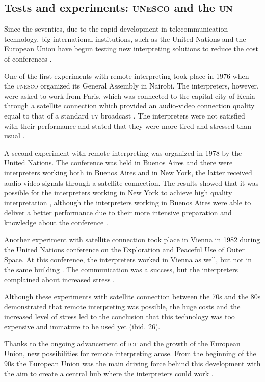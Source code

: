 \documentclass[output=paper]{langsci/langscibook}
\begin{document}
\subsection{Tests and experiments: \textsc{unesco} and the \textsc{un}}
\label{sub:ziegler:3.1}
Since the seventies, due to the rapid development in telecommunication technology, big international institutions, such as the United Nations and the European Union have begun testing new interpreting solutions to reduce the cost of conferences \citep[26]{UNESCO1987}.

One of the first experiments with remote interpreting took place in 1976 when the \textsc{unesco} organized its General Assembly in Nairobi. The interpreters, however, were asked to work from Paris, which was connected to the capital city of Kenia through a satellite connection which provided an audio-video connection quality equal to that of a standard \textsc{tv} broadcast \citep[30]{Mouzourakis1996}. The interpreters were not satisfied with their performance and stated that they were more tired and stressed than usual \citep[294]{Kurz2000}.

A second experiment with remote interpreting was organized in 1978 by the United Nations. The conference was held in Buenos Aires and there were interpreters working both in Buenos Aires and in New York, the latter received audio-video signals through a satellite connection. The results showed that it was possible for the interpreters working in New York to achieve high quality interpretation \citep[26]{UNESCO1987}, although the interpreters working in Buenos Aires were able to deliver a better performance due to their more intensive preparation and knowledge about the conference \citep[82--90]{Chernov2004}. 

Another experiment with satellite connection took place in Vienna in 1982 during the United Nations conference on the Exploration and Peaceful Use of Outer Space. At this conference, the interpreters worked in Vienna as well, but not in the same building \citep[10]{Andres2009}. The communication was a success, but the interpreters complained about increased stress \citep[26]{UNESCO1987}.

Although these experiments with satellite connection between the 70s and the 80s demonstrated that remote interpreting was possible, the huge costs and the increased level of stress led to the conclusion that this technology was too expensive and immature to be used yet (ibid. 26).

Thanks to the ongoing advancement of \textsc{ict} and the growth of the European Union, new possibilities for remote interpreting arose. From the beginning of the 90s the European Union was the main driving force behind this development with the aim to create a central hub where the interpreters could work \citep[3]{Braun2011b}.
\end{document}
